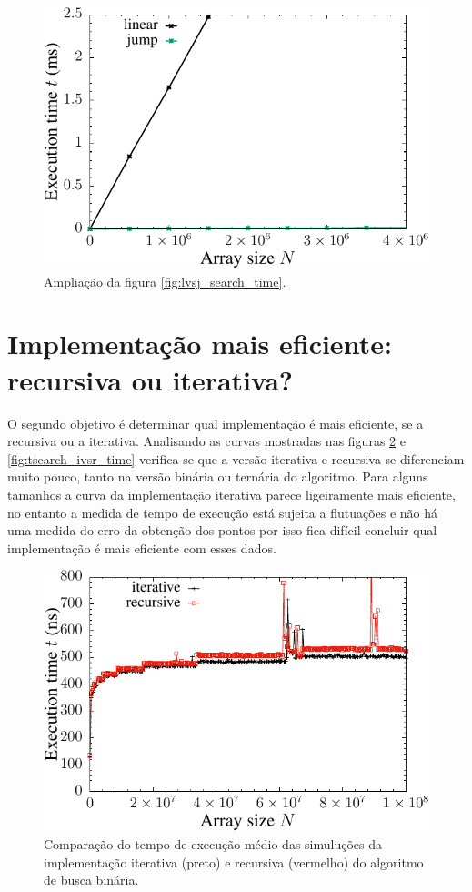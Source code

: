 \begin{figure}[H]
  \centering
  \includegraphics[scale=1.2]{../plots/lvsj_search_time_zoom.pdf}
  \caption{Ampliação da figura \ref{fig:lvsj_search_time}.}
  \label{fig:lvsj_search_time_zoom}
\end{figure} 


\section{Implementação mais eficiente: recursiva ou iterativa?}

O segundo objetivo é determinar qual implementação é mais eficiente, se a recursiva ou a iterativa. Analisando as curvas mostradas nas figuras \ref{fig:bsearch_ivsr_time} e \ref{fig:tsearch_ivsr_time} verifica-se que a versão iterativa e recursiva se diferenciam muito pouco, tanto na versão binária ou ternária do algoritmo. Para alguns tamanhos a curva da implementação iterativa parece ligeiramente mais eficiente, no entanto a medida de tempo de execução está sujeita a flutuações e não há uma medida do erro da obtenção dos pontos por isso fica difícil concluir qual implementação é mais eficiente com esses dados.
\begin{figure}[H]
  \centering
  \includegraphics[scale=1.2]{../plots/bsearch_itvsrec_time.pdf}
  \caption{Comparação do tempo de execução médio das simuluções da implementação iterativa (preto) e recursiva (vermelho) do algoritmo de busca binária.}
  \label{fig:bsearch_ivsr_time}
\end{figure} 

